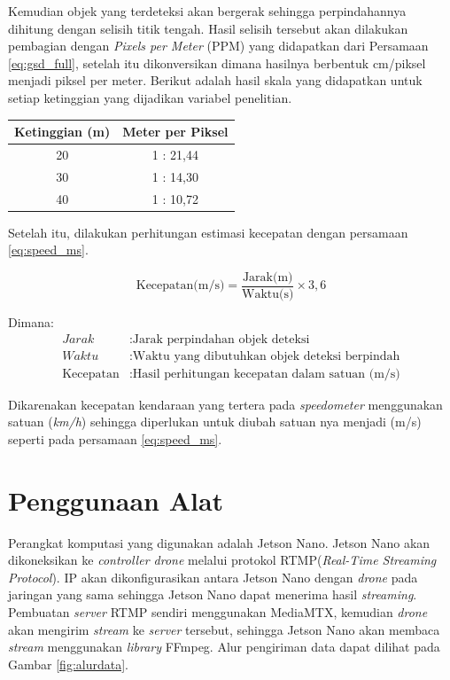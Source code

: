 Kemudian objek yang terdeteksi akan bergerak sehingga perpindahannya dihitung dengan selisih titik tengah. Hasil selisih tersebut akan dilakukan pembagian dengan \emph{Pixels per Meter} (PPM) yang didapatkan dari Persamaan \ref{eq:gsd_full}, setelah itu dikonversikan dimana hasilnya berbentuk cm/piksel menjadi piksel per meter. Berikut adalah hasil skala yang didapatkan untuk setiap ketinggian yang dijadikan variabel penelitian. 

\begin{table}[h!]
  \centering
  \label{tbl:skala_ppm}
  \begin{tabular}{|c|c|}
    \hline
    \rowcolor[gray]{0.9}
    \textbf{Ketinggian (m)} & \textbf{Meter per Piksel} \\ \hline
    20                      & 1 : 21,44                 \\ \hline
    30                      & 1 : 14,30                 \\ \hline
    40                      & 1 : 10,72                 \\ \hline
  \end{tabular}
\end{table}

Setelah itu, dilakukan perhitungan estimasi kecepatan dengan persamaan \ref{eq:speed_ms}.

\begin{equation}
  \label{eq:speed_ms}
  \text{Kecepatan(m/s)} = \frac{\text{Jarak(m)}}{\text{Waktu(s)}} \times 3{,}6
\end{equation}

\begin{flushleft}
Dimana:
\begin{align*}
Jarak & : \text{Jarak perpindahan objek deteksi} \\
Waktu & : \text{Waktu yang dibutuhkan objek deteksi berpindah} \\
\text{Kecepatan} & : \text{Hasil perhitungan kecepatan dalam satuan (m/s)}
\end{align*}
\end{flushleft}

Dikarenakan kecepatan kendaraan yang tertera pada \emph{speedometer} menggunakan satuan (\emph{km/h}) sehingga diperlukan untuk diubah satuan nya menjadi (m/s) seperti pada persamaan \ref{eq:speed_ms}.

\section{Penggunaan Alat}
Perangkat komputasi yang digunakan adalah Jetson Nano. Jetson Nano akan dikoneksikan ke \emph{controller drone} melalui protokol RTMP(\emph{Real-Time Streaming Protocol}). IP akan dikonfigurasikan antara Jetson Nano dengan \emph{drone} pada jaringan yang sama sehingga Jetson Nano dapat menerima hasil \emph{streaming}. Pembuatan \emph{server} RTMP sendiri menggunakan MediaMTX, kemudian \emph{drone} akan mengirim \emph{stream} ke \emph{server} tersebut, sehingga Jetson Nano akan membaca \emph{stream} menggunakan \emph{library} FFmpeg. Alur pengiriman data dapat dilihat pada Gambar \ref{fig:alurdata}.

